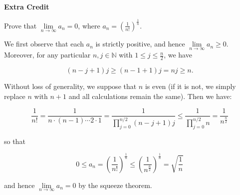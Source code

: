 \textbf{Extra Credit}

Prove that $\lim\limits_{n \to \infty} {a_n} = 0$, where $a_n = \left(\frac{1}{n!}\right)^{\frac{1}{n}}$.

\begin{solution}
    We first observe that each $a_n$ is strictly positive, and hence $\lim\limits_{n \to \infty} {a_n} \ge 0$.
    Moreover, for any particular $n, j \in \mathbb{N}$ with $1 \le j \le \frac{n}{2}$, we have

    $$
    (n - j + 1) j \ge (n - 1 + 1) j = n j \ge n.
    $$

    Without loss of generality, we suppose that $n$ is even (if it is not, we simply replace $n$ with $n + 1$ and all 
    calculations remain the same). Then we have:

    $$
        \frac{1}{n!} = \frac{1}{n \cdot (n - 1) \cdots 2 \cdot 1} 
                     = \frac{1}{\prod_{j=0}^{n/2}(n - j + 1) j}
                     \le \frac{1}{\prod_{j=0}^{n/2} n}
                     = \frac{1}{n^{\frac{n}{2}}}
    $$ 

    so that

    $$
    0 \le a_n = \left(\frac{1}{n!}\right)^{\frac{1}{n}} 
              \le \left(\frac{1}{n^{\frac{n}{2}}}\right)^{\frac{1}{n}}
              = \sqrt{\frac{1}{n}}
    $$

    and hence $\lim\limits_{n \to \infty} {a_n} = 0$ by the squeeze theorem.
\end{solution}